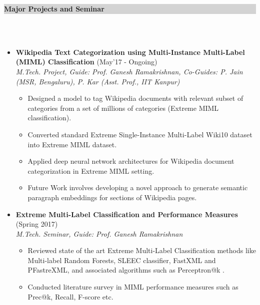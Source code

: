 \documentclass[a4paper,10pt]{article}
\newcommand{\lsep}{-0.5cm}
\newcommand{\hsep}{-0.6cm}
\newcommand{\resheading}[1]{{\small \colorbox{lightgray}{\begin{minipage}{0.975\textwidth}{\textbf{#1 \vphantom{p\^{E}}}}\end{minipage}}}}
\begin{document}
\resheading{\textbf{\large Major Projects and Seminar}}\\[\lsep] \\[-0.4cm]
\begin{itemize}

 \item \textbf{Wikipedia Text Categorization using Multi-Instance Multi-Label (MIML) Classification} \hfill (May'17 - Ongoing)\\
    \emph{M.Tech. Project, Guide: Prof. Ganesh Ramakrishnan, Co-Guides: P. Jain (MSR, Bengaluru), P. Kar (Asst. Prof., IIT Kanpur)} \\[\hsep]
        \begin{itemize}
        	
\item Designed a model to tag Wikipedia documents with relevant subset of categories from a set of millions of categories (Extreme MIML classification).  \\[\hsep]
\item Converted standard Extreme Single-Instance Multi-Label Wiki10 dataset into Extreme MIML dataset.\\[\hsep]
\item Applied deep neural network architectures for Wikipedia document categorization in Extreme MIML setting. \\[\hsep]
\item Future Work involves developing a novel approach to generate semantic paragraph embeddings for sections of Wikipedia pages. 
        \end{itemize}
\vspace{-0.3cm}


 \item \textbf{Extreme Multi-Label Classification and Performance Measures} \hfill(Spring 2017)\\
    \emph{M.Tech. Seminar, Guide: Prof. Ganesh Ramakrishnan} \\[\hsep]
        \begin{itemize}
	        \item Reviewed state of the art Extreme Multi-Label Classification methods like Multi-label Random Forests, SLEEC classifier, FastXML and PFastreXML, and associated algorithms such as Perceptron@k .  \\[\hsep]
            \item Conducted literature survey in MIML performance measures such as Prec@k, Recall, F-score etc. 
        \end{itemize} 
\vspace{-0.3cm}
  

\end{itemize}
\end{document}
